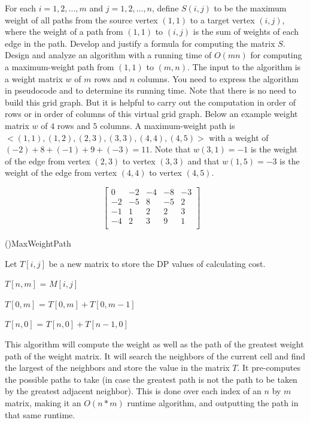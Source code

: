 \documentclass[11pt]{amsart}
\begin{document}
For each $i = 1, 2, ..., m$ and $j = 1, 2, ..., n$,
define $S(i, j)$ to be the maximum weight of all paths from the source vertex $(1, 1)$
to a target vertex $(i, j)$, where the weight of a path from $(1, 1)$
to $(i, j)$ is the sum of weights of each edge in the path.
Develop and justify a formula for computing the matrix $S$.
Design and analyze an algorithm with a running time of $O(mn)$
for computing a maximum-weight path from $(1, 1)$ to $(m, n)$.
The input to the algorithm is a weight matrix $w$ of $m$ rows and $n$ columns. 
You need to express the algorithm in pseudocode and to determine its running time.
Note that there is no need to build this grid graph. But it is helpful
to carry out the computation in order of rows or in order of columns of this virtual grid graph. 
Below an example weight matrix $w$ of $4$ rows and $5$ columns.
A maximum-weight path is $<(1, 1), (1, 2), (2, 3), (3, 3), (4, 4), (4, 5)>$
with a weight of $(-2) + 8 + (-1) + 9 + (-3) = 11$.
Note that $w(3, 1) = -1$ is the weight of the edge from vertex $(2, 3)$ to vertex $(3, 3)$
and  that $w(1, 5) = -3$ is the weight of the edge from vertex $(4, 4)$ to vertex $(4, 5)$.

$$
\begin{bmatrix} 
0  & -2 & -4 & -8 & -3 \\
-2 & -5 & 8  & -5 & 2  \\
-1 & 1  & 2  &  2 & 3  \\
-4 & 2  & 3  &  9 & 1  \\
\end{bmatrix}
\quad
$$
\newpage
\begin{algorithm}[H]
    \Fn(){MaxWeightPath}{
    \SetAlgoLined
    \SetNoFillComment
    \DontPrintSemicolon
        Let $T[i, j]$ be a new matrix to store the DP values of calculating cost.\\
         {
             {
                $T[n, m]$ = $M[i, j]$
            }

             {
                $T[0, m]$ = $T[0, m] + T[0, m - 1]$
            }

             {
                $T[n, 0]$ = $T[n, 0] + T[n - 1, 0]$
            }

        }
    }
    \end{algorithm}
\bigskip
\hspace*{15mm}This algorithm will compute the weight as well as the path of the greatest weight path of the weight matrix. It will search the neighbors of the current cell and find the largest of the neighbors and store the value in the matrix $T$. It pre-computes the possible paths to take (in case the greatest path is not the path to be taken by the greatest adjacent neighbor). This is done over each index of an $n$ by $m$ matrix, making it an $O(n*m)$ runtime algorithm, and outputting the path in that same runtime.
\newpage
\end{document}
